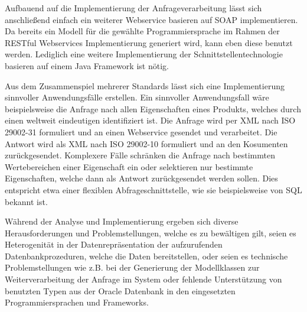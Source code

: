 Aufbauend auf die Implementierung der Anfrageverarbeitung lässt sich anschließend einfach ein weiterer \gls{Webservice} basieren auf \gls{SOAP} implementieren. Da bereits ein Modell für die gewählte Programmiersprache im Rahmen der \gls{REST}ful \glspl{Webservice} Implementierung generiert wird, kann eben diese benutzt werden. Lediglich eine weitere Implementierung der Schnittstellentechnologie basieren auf einem Java Framework ist nötig.  

Aus dem Zusammenspiel mehrerer Standards lässt sich eine Implementierung sinnvoller Anwendungsfälle erstellen. 
Ein sinnvoller Anwendungsfall wäre beispielsweise die Anfrage nach allen Eigenschaften eines Produkts, welches durch einen weltweit eindeutigen  identifiziert ist. Die Anfrage wird per XML nach ISO 29002-31 formuliert und an einen \gls{Webservice} gesendet und verarbeitet. Die Antwort wird als XML nach ISO 29002-10 formuliert und an den Kosumenten zurückgesendet. Komplexere Fälle schränken die Anfrage nach bestimmten Wertebereichen einer Eigenschaft ein oder selektieren nur bestimmte Eigenschaften, welche dann als Antwort zurückgesendet werden sollen. Dies entspricht etwa einer flexiblen \gls{Abfrageschnittstelle}, wie sie beispielsweise von SQL bekannt ist.  

Während der Analyse und Implementierung ergeben sich diverse Herausforderungen und Problemstellungen, welche es zu bewältigen gilt, seien es Heterogenität in der Datenrepräsentation der aufzurufenden Datenbankprozeduren, welche die Daten bereitstellen, oder seien es technische Problemstellungen wie z.B. bei der Generierung der Modellklassen zur Weiterverarbeitung der Anfrage im System oder fehlende Unterstützung von benutzten Typen aus der Oracle Datenbank in den eingesetzten Programmiersprachen und Frameworks.  




